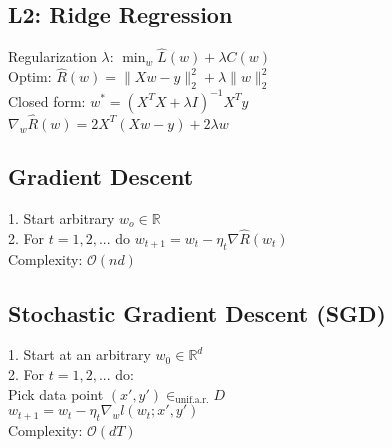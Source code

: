 \subsection*{L2: Ridge Regression}
Regularization $\lambda$: $ \min_w \hat{L}(w) +\lambda C(w)$\\
Optim: $\hat{R}(w)= \| Xw-y \|_2^2 + \lambda \|w\|_2^2$\\
Closed form: $w^*=(X^T X + \lambda I)^{-1} X^T y$\\
$\nabla_w \hat{R}(w) = 2X^T(Xw-y)+ 2 \lambda w$






\subsection*{Gradient Descent}
1. Start arbitrary $w_o \in \mathbb{R}$\\
2. For $t = 1,2,...$ do $w_{t+1} = w_t - \eta_t \nabla \hat{R}(w_t)$\\
Complexity: $\mathcal{O}(nd)$
\subsection*{Stochastic Gradient Descent (SGD)}
1. Start at an arbitrary $w_0 \in \mathbb{R}^d$\\
2. For $t = 1, 2,  ...$ do: \\
	Pick data point $(x',y') \in_{\text{unif.a.r.}} D$\\
	$w_{t+1} = w_t - \eta_t \nabla_w l(w_t;x',y')$\\
Complexity: $\mathcal{O}(dT)$


